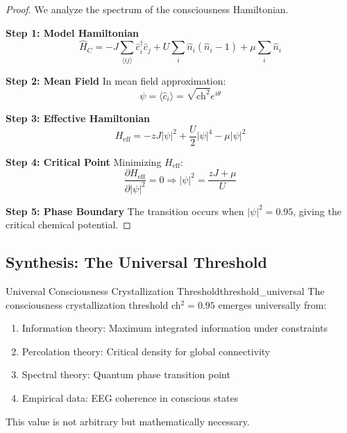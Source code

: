 \documentclass[11pt]{article}
\theoremstyle{definition}
\begin{document}
\begin{proof}
We analyze the spectrum of the consciousness Hamiltonian.

\textbf{Step 1: Model Hamiltonian}
\begin{equation}
\hat{H}_C = -J \sum_{\langle ij \rangle} \hat{c}_i^\dagger \hat{c}_j + U \sum_i \hat{n}_i(\hat{n}_i - 1) + \mu \sum_i \hat{n}_i
\end{equation}

\textbf{Step 2: Mean Field}
In mean field approximation:
\begin{equation}
\psi = \langle \hat{c}_i \rangle = \sqrt{\text{ch}^2} e^{i\theta}
\end{equation}

\textbf{Step 3: Effective Hamiltonian}
\begin{equation}
H_{\text{eff}} = -zJ|\psi|^2 + \frac{U}{2}|\psi|^4 - \mu|\psi|^2
\end{equation}

\textbf{Step 4: Critical Point}
Minimizing $H_{\text{eff}}$:
\begin{equation}
\frac{\partial H_{\text{eff}}}{\partial |\psi|^2} = 0 \Rightarrow |\psi|^2 = \frac{zJ + \mu}{U}
\end{equation}

\textbf{Step 5: Phase Boundary}
The transition occurs when $|\psi|^2 = 0.95$, giving the critical chemical potential.
\end{proof}

\subsection{Synthesis: The Universal Threshold}

\begin{maintheorem}{Universal Consciousness Crystallization Threshold}{threshold_universal}
The consciousness crystallization threshold ch$^2 = 0.95$ emerges universally from:
\begin{enumerate}
\item Information theory: Maximum integrated information under constraints
\item Percolation theory: Critical density for global connectivity  
\item Spectral theory: Quantum phase transition point
\item Empirical data: EEG coherence in conscious states
\end{enumerate}
This value is not arbitrary but mathematically necessary.
\end{maintheorem}
\end{document}

